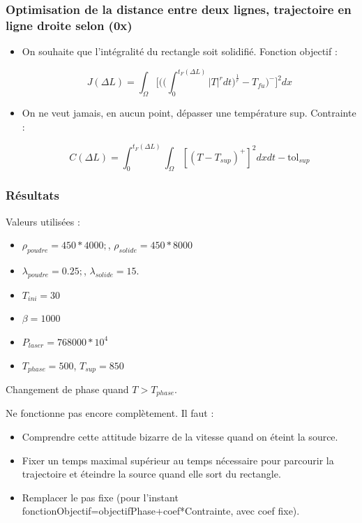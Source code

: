 \documentclass{beamer}
\begin{document}
	\begin{frame}
		\frametitle{Optimisation de la distance entre deux lignes, trajectoire en ligne droite selon (0x)}
		\begin{itemize}
			\item On souhaite que l'intégralité du rectangle soit solidifié. Fonction objectif :
			
			\begin{equation}
			J(\Delta L)=\int_{\Omega}\Bigg[\Bigg(\Big(\int_{0}^{t_F(\Delta L)}|T|^rdt\Big)^{\frac{1}{r}}-T_{fu}\Bigg)^-\Bigg]^2dx
			\end{equation}
			
			\item On ne veut jamais, en aucun point, dépasser une température sup. Contrainte :
			
			\begin{equation}
			\label{eq:contrainte}
			C(\Delta L)=\int_{0}^{t_F(\Delta L)}\int_{\Omega}[(T-T_{sup})^+]^2dxdt-\textrm{tol}_{sup}
			\end{equation} 
			
		\end{itemize}
	\end{frame}
	
	\begin{frame}
		\frametitle{Résultats}
		Valeurs utilisées :
		\begin{itemize}
			\item $\rho_{poudre}=450*4000;$, $\rho_{solide}=450*8000$
			\item $\lambda_{poudre}=0.25;$, $\lambda_{solide}=15.$
			\item $T_{ini}=30$
			\item $\beta=1000$
			\item $P_{laser}=768000*10^4$
			\item $T_{phase}=500$, $T_{sup}=850$
		\end{itemize}
		
		Changement de phase quand $T>T_{phase}$.
		
		\vspace{0cm}
		
		Ne fonctionne pas encore complètement. Il faut :
		
		\begin{itemize}
			\item Comprendre cette attitude bizarre de la vitesse quand on éteint la source.
			\item Fixer un temps maximal supérieur au temps nécessaire pour parcourir la trajectoire et éteindre la source quand elle sort du rectangle.
			\item Remplacer le pas fixe (pour l'instant fonctionObjectif=objectifPhase+coef*Contrainte, avec coef fixe). 
		\end{itemize}
		
	\end{frame}
	
\end{document}
